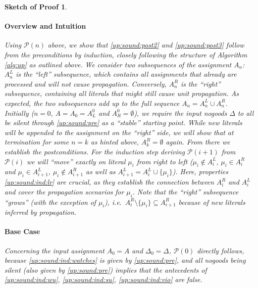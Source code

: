 \documentclass{vutinfth} %
\newtheorem{proof-sketch}{Sketch of Proof}[chapter]
\newcommand{\ass}{A}
\newcommand{\sgl}{\mu}
\begin{document}
\begin{proof-sketch}
\paragraph{Overview and Intuition} Using $\mathcal{P}(n)$ above, we show that \ref{up:sound:post2} and \ref{up:sound:post3} follow from the preconditions by induction, closely following the structure of Algorithm \ref{alg:up} as outlined above. We consider two subsequences of the assignment $A_n$: $\ass_n^L$ is the \enquote{left} subsequence, which contains all assignments that already are processed and will not cause propagation. Conversely, $\ass_n^R$ is the \enquote{right} subsequence, containing all literals that might still cause unit propagation. As expected, the two subsequences add up to the full sequence $A_n = A_n^L \cup A_n^R$. Initially ($n = 0$, $\ass = \ass_0 = \ass_L^0$ and $\ass_R^0 = \emptyset$), we require the input nogoods $\Delta$ to all be silent through \ref{up:sound:pre} as a \enquote{stable} starting point. While new literals will be appended to the assignment on the \enquote{right} side, we will show that at termination for some $n = k$ as hinted above, $\ass_k^R = \emptyset$ again. From there we establish the postconditions. For the induction step deriving $\mathcal{P}(i + 1)$ from $\mathcal{P}(i)$ we will \enquote{move} exactly on literal $\sgl_i$ from right to left ($\sgl_i \not \in \ass_i^L$, $\sgl_i \in \ass_i^R$ and $\sgl_i \in \ass_{i+1}^L$, $\sgl_i \not \in \ass_{i+1}^R$ as well as $\ass_{i+1}^L = \ass_{i}^L \cup \{ \sgl_i \}$). Here, properties \ref{up:sound:ind:lr} are crucial, as they establish the connection between $A_i^R$ and $A_i^L$ and cover the propagation scenarios for $\sgl_i$. Note that the \enquote{right} subsequence \enquote{grows} (with the exception of $\sgl_i$), i.e.~$\ass_{i}^R \setminus \{ \sgl_i \} \subseteq \ass_{i+1}^R$ because of new literals inferred by propagation.

\paragraph{Base Case} Concerning the input assignment $\ass_0 = \ass$ and $\Delta_0 = \Delta$, $\mathcal{P}(0)$ directly follows, because \ref{up:sound:ind:watches} is given by \ref{up:sound:pre}, and all nogoods being silent (also given by \ref{up:sound:pre}) implies that the antecedents of \ref{up:sound:ind:wu}, \ref{up:sound:ind:su}, \ref{up:sound:ind:vio} are false.



\end{proof-sketch}
\end{document}

